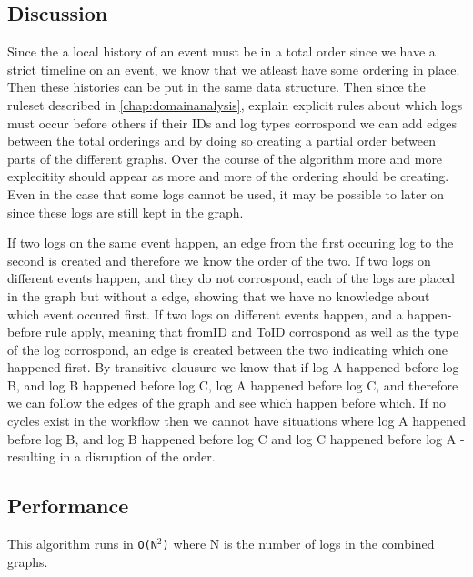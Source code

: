 \subsection{Discussion} %
Since the a local history of an event must be in a total order since we have a strict timeline on an event, we know that we atleast have some ordering in place. Then these histories can be put in the same data structure. Then since the ruleset described in \autoref{chap:domainanalysis}, explain explicit rules about which logs must occur before others if their IDs and log types corrospond we can add edges between the total orderings and by doing so creating a partial order between parts of the different graphs. Over the course of the algorithm more and more explecitity should appear as more and more of the ordering should be creating. Even in the case that some logs cannot be used, it may be possible to later on since these logs are still kept in the graph. %

\newpar If two logs on the same event happen, an edge from the first occuring log to the second is created and therefore we know the order of the two. 
If two logs on different events happen, and they do not corrospond, each of the logs are placed in the graph but without a edge, showing that we have no knowledge about which event occured first.
If two logs on different events happen, and a happen-before rule apply, meaning that fromID and ToID corrospond as well as the type of the log corrospond, an edge is created between the two indicating which one happened first. 
By transitive clousure we know that if log A happened before log B, and log B happened before log C, log A happened before log C, and therefore we can follow the edges of the graph and see which happen before which.
If no cycles exist in the workflow then we cannot have situations where log A happened before log B, and log B happened before log C and log C happened before log A - resulting in a disruption of the order. %

\subsection{Performance} %
This algorithm runs in \texttt{O(N$^2$)} where N is the number of logs in the combined graphs.

